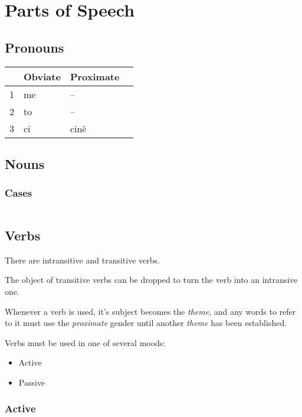 \documentclass[a5paper,twoside]{book}
\newcommand{\Tstrut}{\rule{0pt}{2.6ex}}
\begin{document}
\chapter{Parts of Speech}

\section{Pronouns}

\begin{tabular}{r|l l l}
    & Obviate & Proximate \\\hline
    1 & me & --\Tstrut\\
    2 & to & --\\
    3 & ci & cinê
\end{tabular}

\section{Nouns}

\subsection{Cases}

\begin{tabular}{l l l l l}

\end{tabular}

\section{Verbs}

There are intransitive and transitive verbs.

The object of transitive verbs can be dropped
to turn the verb into an intransive one.

Whenever a verb is used, it's subject
becomes the \emph{theme}, and any words to refer
to it must use the \emph{proximate} gender until another \emph{theme}
has been established.

Verbs must be used in one of several moods:
\begin{itemize}
    \item Active
    \item Passive
\end{itemize}

\subsection{Active}
\end{document}
